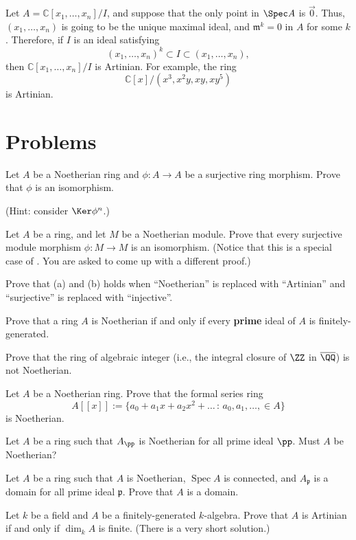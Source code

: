 \begin{example}
    Let $A=\mathbb C[x_1,\dots,x_n]/I$,
    and suppose that the only point in $\Spec A$
    is $\vec 0$. Thus, $(x_1,\dots,x_n)$ is
    going to be the unique maximal ideal,
    and $\mathfrak m^k=0$ in $A$ for some $k$.
    Therefore, if $I$ is an ideal satisfying
    $$(x_1,\dots,x_n)^k \subset I\subset (x_1,\dots,x_n),$$
    then $\mathbb C[x_1,\dots,x_n]/I$ is Artinian.
    For example, the ring
    $$\mathbb C[x]/(x^3, x^2y, xy, xy^5)$$
    is Artinian.
\end{example}

\section{Problems}
\begin{problem}
\begin{alphenum}
\item Let $A$ be a Noetherian ring and $\phi : A\to A$ be a surjective ring morphism. Prove that $\phi$ is an isomorphism.

(Hint: consider $\Ker\phi^n$.)
\item Let $A$ be a ring, and let $M$ be a Noetherian module.
Prove that every surjective module morphism $\phi : M\to M$
is an isomorphism.
(Notice that this is a special case of .
You are asked to come up with a different proof.)
\item Prove that (a) and (b) holds when ``Noetherian'' 
is replaced with ``Artinian'' and ``surjective''
is replaced with ``injective''.
\end{alphenum}
\end{problem}
\begin{problem}
Prove that a ring $A$ is Noetherian if and only if 
every \textbf{prime} ideal of $A$ is finitely-generated.
\end{problem}
\begin{problem}
\label{prob:algebraic_integer}
Prove that the ring of algebraic integer (i.e.,
the integral closure of $\ZZ$ in $\overline\QQ$)
is not Noetherian.
\end{problem}
\begin{problem}
\label{prob:formal_series}
Let $A$ be a Noetherian ring. Prove that the formal series ring
$$A[[x]] := \{a_0+a_1x+a_2x^2+\dots \,:\, a_0,a_1,\dots,\in A\}$$
is Noetherian.
\end{problem}
\begin{problem}
Let $A$ be a ring such that $A_\pp$ is Noetherian 
for all prime ideal $\pp$. 
Must $A$ be Noetherian?
\end{problem}
\begin{problem}
Let $A$ be a ring such that $A$ is Noetherian, 
$\operatorname{Spec} A$ is connected, 
and $A_{\mathfrak p}$ is a domain for all prime ideal 
$\mathfrak p$. Prove that $A$ is a domain. 
\end{problem}
\begin{problem}
Let $k$ be a field and $A$ be a finitely-generated $k$-algebra.
Prove that $A$ is Artinian 
if and only if $\dim_k A$ is finite. 
(There is a very short solution.)
\end{problem}